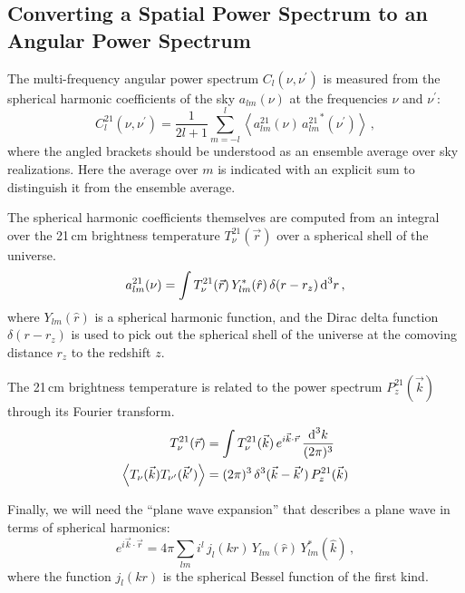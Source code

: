\begin{bibunit}
\section{Converting a Spatial Power Spectrum to an Angular Power Spectrum}
\label{app:spatial-to-angular}

The multi-frequency angular power spectrum $C_l(\nu, \nu^\prime)$ is measured from the spherical
harmonic coefficients of the sky $a_{lm}(\nu)$ at the frequencies $\nu$ and $\nu^\prime$:
\begin{equation}
    C^{21}_l(\nu, \nu^\prime) = \frac{1}{2l+1}\sum_{m = -l}^l \left\langle
        a^{21}_{lm}(\nu) \, {a^{21}_{lm}}^*(\nu^\prime)
    \right\rangle\,,
\end{equation}
where the angled brackets should be understood as an ensemble average over sky realizations. Here
the average over $m$ is indicated with an explicit sum to distinguish it from the ensemble average.

The spherical harmonic coefficients themselves are computed from an integral over the 21\,cm
brightness temperature $T^{21}_\nu(\vec r)$ over a spherical shell of the universe.
\begin{equation}
    a^{21}_{lm}(\nu) = \int T^{21}_\nu(\vec r) \, Y_{lm}^*(\hat r) \, \delta(r - r_z) \, {\textrm d}^3r\,,
\end{equation}
where $Y_{lm}(\hat r)$ is a spherical harmonic function, and the Dirac delta function
$\delta(r-r_z)$ is used to pick out the spherical shell of the universe at the comoving distance
$r_z$ to the redshift $z$.

The 21\,cm brightness temperature is related to the power spectrum $P^{21}_z(\vec k)$ through its
Fourier transform.
\begin{align}
    T^{21}_\nu(\vec r) &=
        \int T^{21}_\nu(\vec k) \, e^{i\vec k\cdot\vec r} \, \frac{{\textrm d}^3k}{(2\pi)^3} \\
    \left\langle T_\nu(\vec k) T_{\nu^\prime}(\vec k^\prime) \right\rangle &=
        (2\pi)^3 \, \delta^3(\vec k - \vec k^\prime) \, P^{21}_z(\vec k)
\end{align}

Finally, we will need the ``plane wave expansion'' that describes a plane wave in terms of spherical
harmonics:
\begin{equation}
    e^{i\vec k\cdot\vec r} = 4\pi \sum_{lm} i^l \, j_l(kr) \, Y_{lm}(\hat r) \, Y^*_{lm}(\hat k)\,,
\end{equation}
where the function $j_l(kr)$ is the spherical Bessel function of the first kind.


\end{bibunit}
